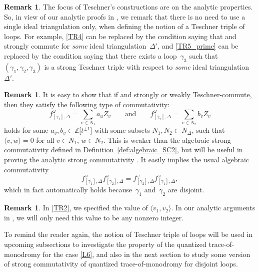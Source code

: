 \documentclass[pdftex]{sigma}
\numberwithin{equation}{section}
\theoremstyle{definition}
\newtheorem{Remark}[Theorem]{Remark}
\begin{document}
\begin{Remark}
The focus of Teschner's constructions are on the analytic properties. So, in view of our analytic proofs in \cite{sequel}, we remark that there is no need to use a single ideal triangulation only, when defining the notion of a Teschner triple of loops. For example, \ref{TR4} can be replaced by the condition saying that  and  strongly commute for {\em some} ideal triangulation~$\Delta'$, and \ref{TR5_prime} can be replaced by the condition saying that there exists a loop~$\gamma_3$ such that $(\gamma_1,\gamma_2,\gamma_3)$ is a strong Teschner triple with respect to {\em some} ideal triangulation~$\Delta'$.
\end{Remark}
\begin{Remark}
It is easy to show that if  and  strongly or weakly Teschner-commute, then they satisfy the following type of commutativity:
\[
f^\omega_{[\gamma_1],\Delta} = \sum_{v \in N_1} a_u Z_v \qquad \text{and} \qquad f^\omega_{[\gamma_2],\Delta} = \sum_{v\in N_2} b_v Z_v
\]
 holds for some $a_v,b_v \in \mathbb{Z}\bigl[t^{\pm 1}\bigr]$ with some subsets $N_1,N_2 \subset N_\Delta$, such that $\langle v,w\rangle =0$ for all ${v\in N_1}$, ${w\in N_2}$. This is weaker than the algebraic strong commutativity defined in Definition~\ref{def:algebraic_SC2}, but will be useful in proving the analytic strong commutativity \cite{sequel}. It easily implies the usual algebraic commutativity
\[
 f^\omega_{[\gamma_1],\Delta}f^\omega_{[\gamma_2],\Delta}=f^\omega_{[\gamma_2],\Delta}f^\omega_{[\gamma_1],\Delta},
\]
 which in fact automatically holds because~$\gamma_1$ and~$\gamma_2$ are disjoint.
\end{Remark}
\begin{Remark}\label{rem:bracket_of_v1_and_v2}
In \ref{TR2}, we specified the value of $\langle v_1,v_2\rangle$. In our analytic arguments in \cite{sequel}, we will only need this value to be any nonzero integer.
\end{Remark}
To remind the reader again, the notion of Teschner triple of loops will be used in upcoming subsections to investigate the property of the quantized trace-of-monodromy for the case \ref{L6}, and also in the next section to study some version of strong commutativity of quantized trace-of-monodromy for disjoint loops.
\end{document}
